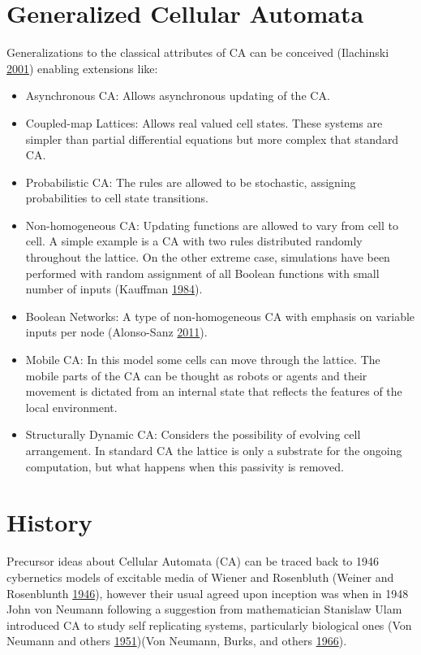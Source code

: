 \documentclass[
  openany]{book}
\begin{document}
\hypertarget{generalized-cellular-automata}{%
\section{Generalized Cellular Automata}\label{generalized-cellular-automata}}

Generalizations to the classical attributes of CA can be conceived (Ilachinski \protect\hyperlink{ref-ilachinski2001cellular}{2001}) enabling extensions like:

\begin{itemize}
\item
  Asynchronous CA:
  Allows asynchronous updating of the CA.
\item
  Coupled-map Lattices:
  Allows real valued cell states. These systems are simpler than partial differential equations but more complex that standard CA.
\item
  Probabilistic CA:
  The rules are allowed to be stochastic, assigning probabilities to cell state transitions.
\item
  Non-homogeneous CA:
  Updating functions are allowed to vary from cell to cell. A simple example is a CA with two rules distributed randomly throughout the lattice. On the other extreme case, simulations have been performed with random assignment of all Boolean functions with small number of inputs (Kauffman \protect\hyperlink{ref-kauffman1984emergent}{1984}).
\item
  Boolean Networks:
  A type of non-homogeneous CA with emphasis on variable inputs per node (Alonso-Sanz \protect\hyperlink{ref-alonso2011discrete}{2011}).
\item
  Mobile CA:
  In this model some cells can move through the lattice. The mobile parts of the CA can be thought as robots or agents and their movement is dictated from an internal state that reflects the features of the local environment.
\item
  Structurally Dynamic CA:
  Considers the possibility of evolving cell arrangement. In standard CA the lattice is only a substrate for the ongoing computation, but what happens when this passivity is removed.
\end{itemize}

\hypertarget{history}{%
\section{History}\label{history}}

Precursor ideas about Cellular Automata (CA) can be traced back to 1946 cybernetics models of excitable media of Wiener and Rosenbluth (Weiner and Rosenblunth \protect\hyperlink{ref-weiner1946mathematical}{1946}), however their usual agreed upon inception was when in 1948 John von Neumann following a suggestion from mathematician Stanislaw Ulam introduced CA to study self replicating systems, particularly biological ones (Von Neumann and others \protect\hyperlink{ref-von1951general}{1951})(Von Neumann, Burks, and others \protect\hyperlink{ref-von1966theory}{1966}).
\end{document}

